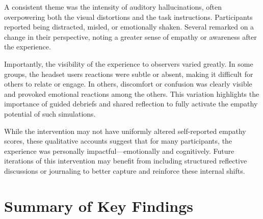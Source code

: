 A consistent theme was the intensity of auditory hallucinations, often overpowering both the visual distortions and the task instructions. Participants reported being distracted, misled, or emotionally shaken. Several remarked on a change in their perspective, noting a greater sense of empathy or awareness after the experience.

Importantly, the visibility of the experience to observers varied greatly. In some groups, the headset users reactions were subtle or absent, making it difficult for others to relate or engage. In others, discomfort or confusion was clearly visible and provoked emotional reactions among the others. This variation highlights the importance of guided debriefs and shared reflection to fully activate the empathy potential of such simulations.

While the intervention may not have uniformly altered self-reported empathy scores, these qualitative accounts suggest that for many participants, the experience was personally impactful—emotionally and cognitively. Future iterations of this intervention may benefit from including structured reflective discussions or journaling to better capture and reinforce these internal shifts.


\section{Summary of Key Findings}

